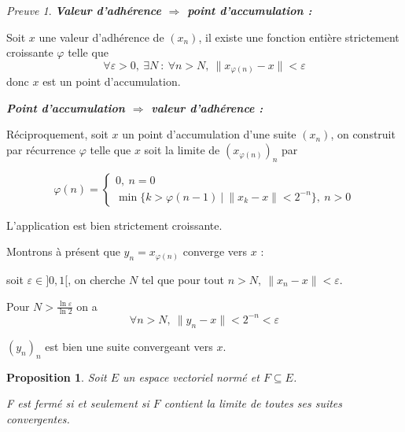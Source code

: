 \documentclass[]{article}
\newtheorem{myproposition}{Proposition}
\theoremstyle{remark}
\newtheorem{myproof}{Preuve}
\theoremstyle{definition}
\newenvironment{proofpart}[1]{
	\leavevmode
	
	\noindent
	{\textit{\textbf{\boldmath #1}}}
	
}{
	\checkmark
}
\begin{document}
\begin{myproof}
	\begin{proofpart}{Valeur d'adhérence $\Longrightarrow$ point d'accumulation :}
	
		Soit $x$ une valeur d'adhérence de $(x_n)$, il existe une fonction entière strictement croissante $\varphi$ telle que $$\forall \varepsilon > 0, ~ \exists N ~ : ~ \forall n > N, ~ \|x_{\varphi(n)}-x\| < \varepsilon$$
		donc $x$ est un point d'accumulation.
	\end{proofpart}
	
	\begin{proofpart}{Point d'accumulation $\Longrightarrow$ valeur d'adhérence :}
		Réciproquement, soit $x$ un point d'accumulation d'une suite $(x_n)$, on construit par récurrence $\varphi$ telle que $x$ soit la limite de $(x_{\varphi(n)})_n$ par 
		
		$$
		\varphi(n) = \left\{
			\begin{array}{ll}
				0, ~ n = 0 \\
				\min\{k > \varphi(n-1) ~ | ~ \|x_k-x\| < 2^{-n}\}, ~ n > 0
			\end{array}
		\right.
		$$
		
		L'application est bien strictement croissante.
		
		Montrons à présent que $y_n=x_{\varphi(n)}$ converge vers $x$ : 
		
		soit $\varepsilon \in ]0, 1[$, on cherche $N$ tel que pour tout $n > N, ~ \|x_n-x\| < \varepsilon$.
		
		Pour $N > \frac{\ln \varepsilon}{\ln 2}$ on a $$\forall n > N, ~ \|y_n-x\| < 2^{-n} < \varepsilon$$
		
		$(y_n)_n$ est bien une suite convergeant vers $x$.
	\end{proofpart}
	
\end{myproof}

\begin{myproposition}
	Soit $E$ un espace vectoriel normé et $F \subseteq E$.
	
	F est fermé \textit{si et seulement si} $F$ contient la limite de toutes ses suites convergentes.
\end{myproposition}
\end{document}
